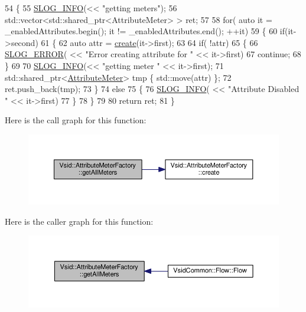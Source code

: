 \begin{DoxyCode}
54 \{
55     \hyperlink{_logger_8h_a119c1c29ba35a8db38e2358e41167282}{SLOG\_INFO}(<< \textcolor{stringliteral}{"getting meters"});
56     std::vector<std::shared\_ptr<AttributeMeter> > ret;
57 
58     \textcolor{keywordflow}{for}( \textcolor{keyword}{auto} it = \_enabledAttributes.begin(); it != \_enabledAttributes.end(); ++it)
59     \{       
60         \textcolor{keywordflow}{if}(it->second)
61         \{
62             \textcolor{keyword}{auto} attr = \hyperlink{class_vsid_1_1_attribute_meter_factory_ab376f8420a3c689e5691bbae5b8867a8}{create}(it->first);
63             
64             \textcolor{keywordflow}{if}( !attr)
65             \{
66                 \hyperlink{_logger_8h_a2a8694cd392d18f4db6b9cc9f15bafe3}{SLOG\_ERROR}( << \textcolor{stringliteral}{"Error creating attribute for "} << it->first)
67                 continue;
68             \}
69 
70             \hyperlink{_logger_8h_a119c1c29ba35a8db38e2358e41167282}{SLOG\_INFO}(<< "getting meter " << it->first);
71             std::shared\_ptr<\hyperlink{class_vsid_1_1_attribute_meter}{AttributeMeter}> tmp \{ std::move(attr) \};
72             ret.push\_back(tmp);
73         \}
74         \textcolor{keywordflow}{else}
75         \{
76             \hyperlink{_logger_8h_a119c1c29ba35a8db38e2358e41167282}{SLOG\_INFO}( << \textcolor{stringliteral}{"Attribute Disabled "} << it->first)
77         \}
78     \}
79 
80     \textcolor{keywordflow}{return} ret;
81 \}
\end{DoxyCode}


Here is the call graph for this function\-:
\nopagebreak
\begin{figure}[H]
\begin{center}
\leavevmode
\includegraphics[width=350pt]{class_vsid_1_1_attribute_meter_factory_ae44a5e19247998216c9e55112c790dea_cgraph}
\end{center}
\end{figure}




Here is the caller graph for this function\-:
\nopagebreak
\begin{figure}[H]
\begin{center}
\leavevmode
\includegraphics[width=350pt]{class_vsid_1_1_attribute_meter_factory_ae44a5e19247998216c9e55112c790dea_icgraph}
\end{center}
\end{figure}


